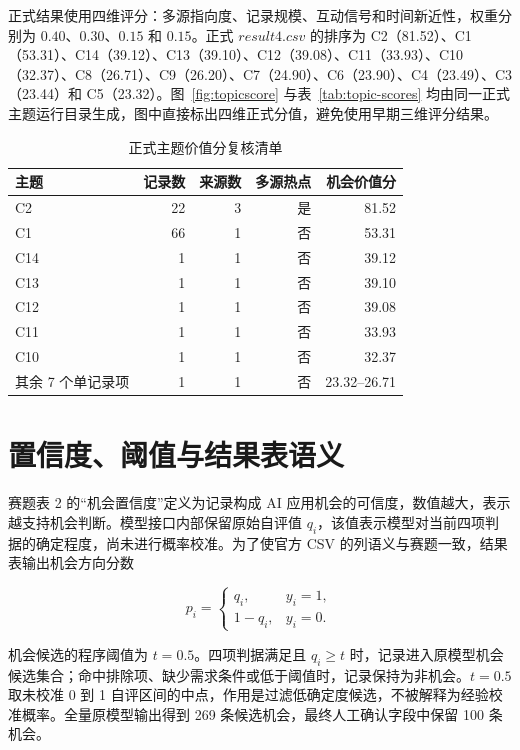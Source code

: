 正式结果使用四维评分：多源指向度、记录规模、互动信号和时间新近性，权重分别为 $0.40$、$0.30$、$0.15$ 和 $0.15$。正式 $result4.csv$ 的排序为 C2（81.52）、C1（53.31）、C14（39.12）、C13（39.10）、C12（39.08）、C11（33.93）、C10（32.37）、C8（26.71）、C9（26.20）、C7（24.90）、C6（23.90）、C4（23.49）、C3（23.44）和 C5（23.32）。图~\ref{fig:topicscore} 与表~\ref{tab:topic-scores} 均由同一正式主题运行目录生成，图中直接标出四维正式分值，避免使用早期三维评分结果。

\begin{table}[H]
  \centering
  \small
  \caption[正式主题价值分复核清单]{正式主题价值分复核清单}
  \label{tab:formal-score-audit}
  \begin{tabular}{lrrrr}
    \toprule
    主题 & 记录数 & 来源数 & 多源热点 & 机会价值分 \\
    \midrule
    C2 & 22 & 3 & 是 & 81.52 \\
    C1 & 66 & 1 & 否 & 53.31 \\
    C14 & 1 & 1 & 否 & 39.12 \\
    C13 & 1 & 1 & 否 & 39.10 \\
    C12 & 1 & 1 & 否 & 39.08 \\
    C11 & 1 & 1 & 否 & 33.93 \\
    C10 & 1 & 1 & 否 & 32.37 \\
    其余 7 个单记录项 & 1 & 1 & 否 & 23.32--26.71 \\
    \bottomrule
  \end{tabular}
\end{table}

\section{置信度、阈值与结果表语义}

赛题表 2 的“机会置信度”定义为记录构成 AI 应用机会的可信度，数值越大，表示越支持机会判断。模型接口内部保留原始自评值 $q_i$，该值表示模型对当前四项判据的确定程度，尚未进行概率校准。为了使官方 CSV 的列语义与赛题一致，结果表输出机会方向分数

\begin{equation}
 p_i=\begin{cases}
 q_i,& y_i=1,\\
 1-q_i,& y_i=0.
 \end{cases}
\end{equation}

机会候选的程序阈值为 $t=0.5$。四项判据满足且 $q_i\geq t$ 时，记录进入原模型机会候选集合；命中排除项、缺少需求条件或低于阈值时，记录保持为非机会。$t=0.5$ 取未校准 0 到 1 自评区间的中点，作用是过滤低确定度候选，不被解释为经验校准概率。全量原模型输出得到 269 条候选机会，最终人工确认字段中保留 100 条机会。

